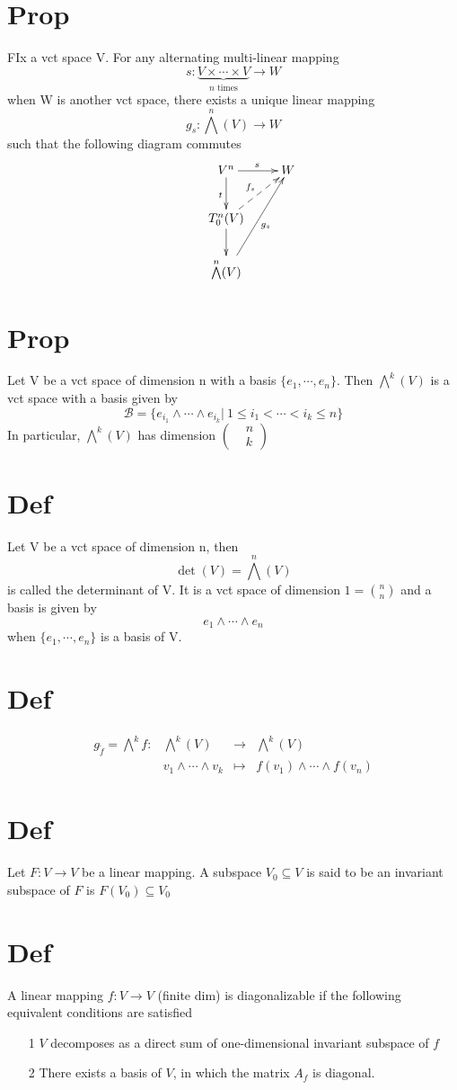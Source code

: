 \documentclass{article}
\begin{document}
\section{Prop}
\label{VIII-46.8}
FIx a vct space V. For any alternating multi-linear mapping
$$s:\underbrace{V\times\cdots\times V}\limits_{n\text{ times}}\rightarrow W$$
when W is another vct space, there exists a unique linear mapping$$g_s:\bigwedge\limits^n(V)\rightarrow W$$
such that the following diagram commutes
$$\xymatrix{
    & V^n\ar[d]_t\ar[r]^s & W\\
    &T^n_0(V)\ar@{-->}[ur]^{f_s}\ar[d] &\\
    & \bigwedge\limits^n(V)\ar[uur]_{g_s}
}$$
\section{Prop}
Let V be a vct space of dimension n with a basis $\{e_1,\cdots,e_n\}$. Then $\bigwedge\limits^k(V)$ is a vct space with a basis given by $$\mathcal{B}=\{e_{i_1}\wedge\cdots\wedge e_{i_k}\big|\ 1\leq i_1<\cdots<i_k\leq n\}$$
In particular, $\bigwedge\limits^k(V)$ has dimension $\left(\begin{aligned}
    &n \\ &k
\end{aligned}
\right)$
\section{Def}
Let V be a vct space of dimension n, then 
$$\det(V)=\bigwedge\limits^n(V)$$
is called the determinant of V. It is a vct space of dimension $1=\binom{n}{n}$ and a basis is given by $$e_1\wedge\cdots\wedge e_n$$
when $\{e_1,\cdots,e_n\}$ is a basis of V.
\section{Def}
$$
\begin{aligned}
    g_{\widetilde{f}}=\bigwedge\limits^kf: &\bigwedge\limits^k(V) &\rightarrow &\bigwedge\limits^k(V)\\
    &v_1\wedge\cdots\wedge v_k &\mapsto & f(v_1)\wedge\cdots\wedge f(v_n)
\end{aligned}$$
\section{Def}
Let $F:V\rightarrow V$ be a linear mapping. A subspace $V_0\subseteq V$ is said to be an invariant subspace of $F$ is $F(V_0)\subseteq V_0$
\section{Def}
A linear mapping $f:V\rightarrow V$ (finite dim) is diagonalizable if the following equivalent conditions are satisfied
\begin{itemize}
    \item [1] $V$ decomposes as a direct sum of one-dimensional invariant subspace of $f$
    \item [2] There exists a basis of $V$, in which the matrix $A_f$ is diagonal.
\end{itemize}
\end{document}
